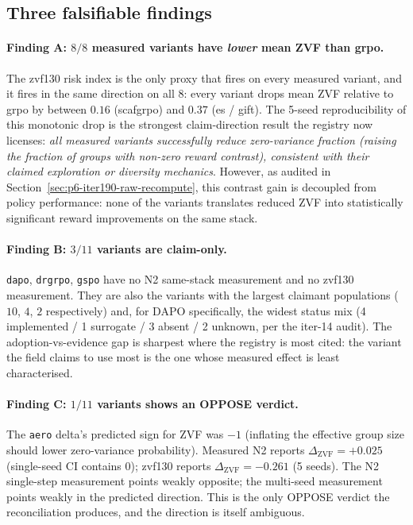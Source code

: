 \subsection{Three falsifiable findings}

\paragraph{Finding A: $8/8$ measured variants have \emph{lower} mean ZVF
than grpo.}
The zvf130 risk index is the only proxy that fires on every measured
variant, and it fires in the same direction on all 8: every variant
drops mean ZVF relative to grpo by between $0.16$ (scafgrpo) and $0.37$
(es / gift). The 5-seed reproducibility of this monotonic drop is the
strongest claim-direction result the registry now licenses: \emph{all
measured variants successfully reduce zero-variance fraction (raising the
fraction of groups with non-zero reward contrast), consistent with their
claimed exploration or diversity mechanics}. However, as audited in
Section~\ref{sec:p6-iter190-raw-recompute}, this contrast gain is decoupled
from policy performance: none of the variants translates reduced ZVF into
statistically significant reward improvements on the same stack.

\paragraph{Finding B: $3/11$ variants are claim-only.}
\texttt{dapo}, \texttt{drgrpo}, \texttt{gspo} have no N2 same-stack
measurement and no zvf130 measurement. They are also the variants with
the largest claimant populations ($10$, $4$, $2$ respectively) and,
for DAPO specifically, the widest status mix (4 implemented / 1
surrogate / 3 absent / 2 unknown, per the iter-14 audit). The
adoption-vs-evidence gap is sharpest where the registry is most cited:
the variant the field claims to use most is the one whose measured
effect is least characterised.

\paragraph{Finding C: $1/11$ variants shows an OPPOSE verdict.}
The \texttt{aero} delta's predicted sign for ZVF was $-1$ (inflating
the effective group size should lower zero-variance probability).
Measured N2 reports $\Delta_{\text{ZVF}}{=}+0.025$ (single-seed CI
contains 0); zvf130 reports $\Delta_{\text{ZVF}}{=}-0.261$ (5 seeds).
The N2 single-step measurement points weakly opposite; the
multi-seed measurement points weakly in the predicted direction. This
is the only OPPOSE verdict the reconciliation produces, and the
direction is itself ambiguous.

